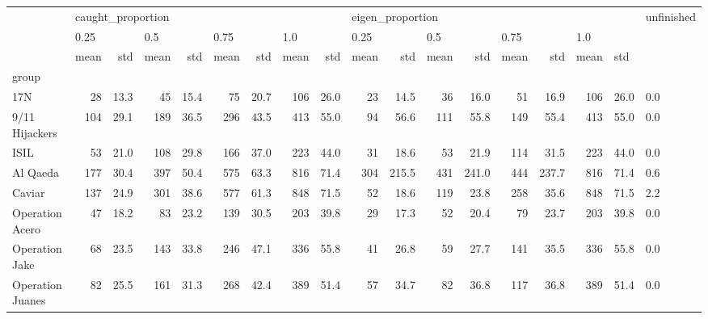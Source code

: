 \begin{tabular}{lrrrrrrrrrrrrrrrrl}
\toprule
{} & \multicolumn{8}{l}{caught\_proportion} & \multicolumn{8}{l}{eigen\_proportion} & unfinished \\
{} & \multicolumn{2}{l}{0.25} & \multicolumn{2}{l}{0.5} & \multicolumn{2}{l}{0.75} & \multicolumn{2}{l}{1.0} & \multicolumn{2}{l}{0.25} & \multicolumn{2}{l}{0.5} & \multicolumn{2}{l}{0.75} & \multicolumn{3}{l}{1.0} \\
{} &              mean &   std & mean &   std & mean &   std & mean &   std &             mean &    std & mean &    std & mean &    std & mean & \multicolumn{2}{l}{std} \\
group                &                   &       &      &       &      &       &      &       &                  &        &      &        &      &        &      &       &            \\
\midrule
17N                  &                28 &  13.3 &   45 &  15.4 &   75 &  20.7 &  106 &  26.0 &               23 &   14.5 &   36 &   16.0 &   51 &   16.9 &  106 &  26.0 &        0.0 \\
9/11 Hijackers       &               104 &  29.1 &  189 &  36.5 &  296 &  43.5 &  413 &  55.0 &               94 &   56.6 &  111 &   55.8 &  149 &   55.4 &  413 &  55.0 &        0.0 \\
ISIL                 &                53 &  21.0 &  108 &  29.8 &  166 &  37.0 &  223 &  44.0 &               31 &   18.6 &   53 &   21.9 &  114 &   31.5 &  223 &  44.0 &        0.0 \\
Al Qaeda             &               177 &  30.4 &  397 &  50.4 &  575 &  63.3 &  816 &  71.4 &              304 &  215.5 &  431 &  241.0 &  444 &  237.7 &  816 &  71.4 &        0.6 \\
Caviar               &               137 &  24.9 &  301 &  38.6 &  577 &  61.3 &  848 &  71.5 &               52 &   18.6 &  119 &   23.8 &  258 &   35.6 &  848 &  71.5 &        2.2 \\
Operation Acero      &                47 &  18.2 &   83 &  23.2 &  139 &  30.5 &  203 &  39.8 &               29 &   17.3 &   52 &   20.4 &   79 &   23.7 &  203 &  39.8 &        0.0 \\
Operation Jake       &                68 &  23.5 &  143 &  33.8 &  246 &  47.1 &  336 &  55.8 &               41 &   26.8 &   59 &   27.7 &  141 &   35.5 &  336 &  55.8 &        0.0 \\
Operation Juanes     &                82 &  25.5 &  161 &  31.3 &  268 &  42.4 &  389 &  51.4 &               57 &   34.7 &   82 &   36.8 &  117 &   36.8 &  389 &  51.4 &        0.0 \\

\end{tabular}
